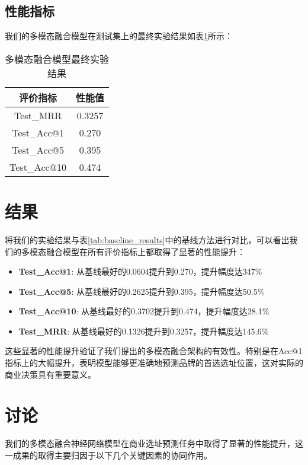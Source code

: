 \documentclass{article}
\begin{document}
\subsection{性能指标}

我们的多模态融合模型在测试集上的最终实验结果如表\ref{tab:final_results}所示：

\begin{table}[H]
\centering
\begin{tabular}{|c|c|}
\hline
\rowcolor[HTML]{D9EAD3}
\textbf{评价指标} & \textbf{性能值} \\ \hline
Test\_MRR & 0.3257 \\ \hline
Test\_Acc@1 & 0.270 \\ \hline
Test\_Acc@5 & 0.395 \\ \hline
Test\_Acc@10 & 0.474 \\ \hline
\end{tabular}
\caption{多模态融合模型最终实验结果}
\label{tab:final_results}
\end{table}

\section{结果}

将我们的实验结果与表\ref{tab:baseline_results}中的基线方法进行对比，可以看出我们的多模态融合模型在所有评价指标上都取得了显著的性能提升：

\begin{itemize}
\item \textbf{Test\_Acc@1}: 从基线最好的0.0604提升到0.270，提升幅度达347\%
\item \textbf{Test\_Acc@5}: 从基线最好的0.2625提升到0.395，提升幅度达50.5\%
\item \textbf{Test\_Acc@10}: 从基线最好的0.3702提升到0.474，提升幅度达28.1\%
\item \textbf{Test\_MRR}: 从基线最好的0.1326提升到0.3257，提升幅度达145.6\%
\end{itemize}

这些显著的性能提升验证了我们提出的多模态融合架构的有效性。特别是在Acc@1指标上的大幅提升，表明模型能够更准确地预测品牌的首选选址位置，这对实际的商业决策具有重要意义。

\section{讨论}

我们的多模态融合神经网络模型在商业选址预测任务中取得了显著的性能提升，这一成果的取得主要归因于以下几个关键因素的协同作用。
\end{document}
